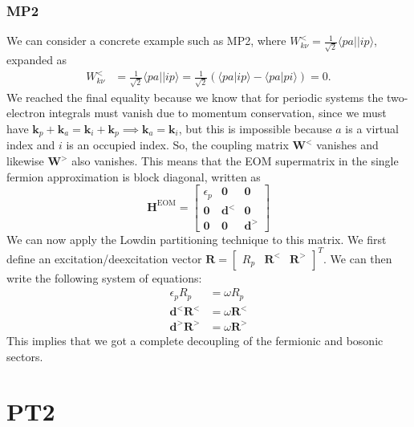 \subsubsection{MP2}
We can consider a concrete example such as MP2, where $W^<_{k\nu} = \frac{1}{\sqrt{2}}\langle p a||i p\rangle$, expanded as 
\begin{align}
W^<_{k\nu} &= \frac{1}{\sqrt{2}}\langle p a||i p\rangle = \frac{1}{\sqrt{2}}\left( \langle p a|i p\rangle - \langle p a|p i\rangle \right) = 0.
\end{align}
We reached the final equality because we know that for periodic systems the two-electron integrals must vanish due to momentum conservation, since we must have $\bm{k}_p + \bm{k}_a = \bm{k}_i + \bm{k}_p \implies \bm{k}_a = \bm{k}_i$, but this is impossible because $a$ is a virtual index and $i$ is an occupied index. So, the coupling matrix $\bm{W}^<$ vanishes and likewise $\bm{W}^>$ also vanishes. This means that the EOM supermatrix in the single fermion approximation is block diagonal, written as
\begin{equation}
\bm{H}^{\mathrm{EOM}} = \begin{bmatrix}
    \epsilon_p & \bm{0} & \bm{0} \\
    \bm{0} &  \bm{d}^< & \bm{0} \\
    \bm{0} & \bm{0} & \bm{d}^>
\end{bmatrix}\end{equation}
We can now apply the Lowdin partitioning technique to this matrix. We first define an excitation/deexcitation vector $\bm{R} = \begin{bmatrix}
    R_p & \bm{R}^< & \bm{R}^>
\end{bmatrix}^T$. We can then write the following system of equations:
\begin{align}
\epsilon_p R_p &= \omega R_p \\
 \bm{d}^< \bm{R}^< &= \omega \bm{R}^< \\
 \bm{d}^> \bm{R}^> &= \omega \bm{R}^>
\end{align}
This implies that we got a complete decoupling of the fermionic and bosonic sectors.
\section{PT2}

